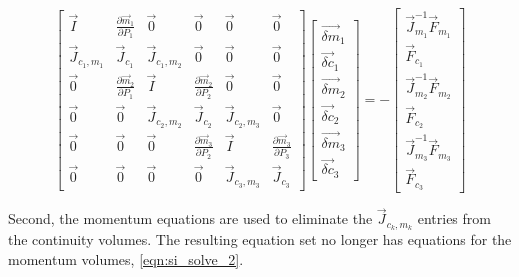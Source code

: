   \begin{equation}
 \label{eqn:si_solve_1}
 \begin{bmatrix} 
 \vec{I} & \frac{\partial \vec{m}_1}{\partial P_1} & \vec{0} & \vec{0} & \vec{0} & \vec{0}\\
 \vec{J}_{c_1,m_1} & \vec{J}_{c_1} & \vec{J}_{c_1,m_2} & \vec{0} & \vec{0} & \vec{0} \\
 \vec{0} & \frac{\partial \vec{m}_2}{\partial P_1} & \vec{I} & \frac{\partial \vec{m}_2}{\partial P_2} & \vec{0} & \vec{0} \\
 \vec{0} & \vec{0} & \vec{J}_{c_2,m_2} & \vec{J}_{c_2} & \vec{J}_{c_2,m_3} & \vec{0} \\
 \vec{0} & \vec{0} & \vec{0} & \frac{\partial \vec{m}_{3}}{\partial P_2} & \vec{I} & \frac{\partial \vec{m}_{3}}{\partial P_3} \\ 
 \vec{0} & \vec{0} & \vec{0} & \vec{0} & \vec{J}_{c_3,m_3} & \vec{J}_{c_3}  
 \end{bmatrix} \begin{bmatrix}
 \vec{\delta m}_{1} \\ \vec{\delta c}_{1} \\
 \vec{\delta m}_{2} \\ \vec{\delta c}_{2} \\
 \vec{\delta m}_{3} \\ \vec{\delta c}_{3}
\end{bmatrix}  = -\begin{bmatrix}
 \vec{J}^{-1}_{m_1}\vec{F}_{m_1} \\ \vec{F}_{c_1} \\
 \vec{J}^{-1}_{m_2}\vec{F}_{m_2} \\ \vec{F}_{c_2} \\
 \vec{J}^{-1}_{m_3}\vec{F}_{m_3} \\ \vec{F}_{c_3} \end{bmatrix}
 \end{equation}

Second, the momentum equations are used to eliminate the $\vec{J}_{c_k,m_k}$ entries from the continuity volumes.
The resulting equation set no longer has equations for the momentum volumes, \eqref{eqn:si_solve_2}.


